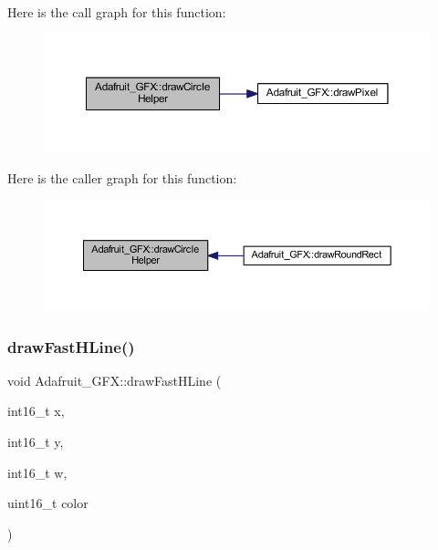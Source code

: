 Here is the call graph for this function\+:
\nopagebreak
\begin{figure}[H]
\begin{center}
\leavevmode
\includegraphics[width=350pt]{d9/d97/class_adafruit___g_f_x_a3f2dd7b698e7b95ebf9fecf992ff802e_cgraph}
\end{center}
\end{figure}
Here is the caller graph for this function\+:
\nopagebreak
\begin{figure}[H]
\begin{center}
\leavevmode
\includegraphics[width=350pt]{d9/d97/class_adafruit___g_f_x_a3f2dd7b698e7b95ebf9fecf992ff802e_icgraph}
\end{center}
\end{figure}
\mbox{\label{class_adafruit___g_f_x_a4d42e7cc577c1eb5b06fe656786c9c79}} 
\subsubsection{\texorpdfstring{draw\+Fast\+H\+Line()}{drawFastHLine()}}
{\footnotesize\ttfamily void Adafruit\+\_\+\+G\+F\+X\+::draw\+Fast\+H\+Line (\begin{DoxyParamCaption}\item[{int16\+\_\+t}]{x,  }\item[{int16\+\_\+t}]{y,  }\item[{int16\+\_\+t}]{w,  }\item[{uint16\+\_\+t}]{color }\end{DoxyParamCaption})}


